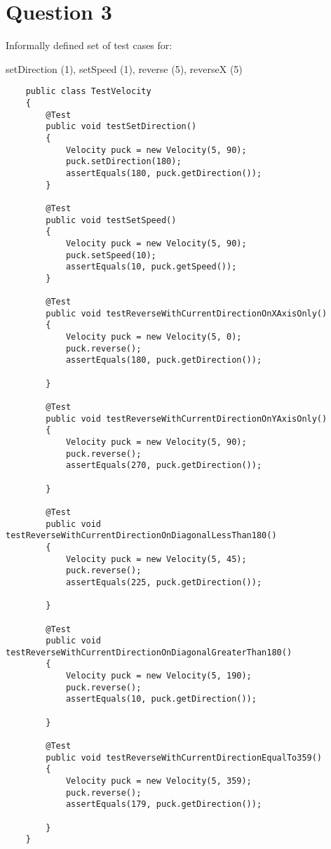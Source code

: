 \documentclass{article}
\begin{document}
\section*{Question 3}

Informally defined set of test cases for:

setDirection (1), setSpeed (1), reverse (5), reverseX (5)

\begin{lstlisting}
    public class TestVelocity
    {
        @Test
        public void testSetDirection()
        {
            Velocity puck = new Velocity(5, 90);
            puck.setDirection(180);
            assertEquals(180, puck.getDirection());
        }

        @Test
        public void testSetSpeed()
        {
            Velocity puck = new Velocity(5, 90);
            puck.setSpeed(10);
            assertEquals(10, puck.getSpeed());
        }

        @Test
        public void testReverseWithCurrentDirectionOnXAxisOnly()
        {
            Velocity puck = new Velocity(5, 0);
            puck.reverse();
            assertEquals(180, puck.getDirection());
            
        }

        @Test
        public void testReverseWithCurrentDirectionOnYAxisOnly()
        {
            Velocity puck = new Velocity(5, 90);
            puck.reverse();
            assertEquals(270, puck.getDirection());
            
        }

        @Test
        public void testReverseWithCurrentDirectionOnDiagonalLessThan180()
        {
            Velocity puck = new Velocity(5, 45);
            puck.reverse();
            assertEquals(225, puck.getDirection());
            
        }

        @Test
        public void testReverseWithCurrentDirectionOnDiagonalGreaterThan180()
        {
            Velocity puck = new Velocity(5, 190);
            puck.reverse();
            assertEquals(10, puck.getDirection());
            
        }

        @Test
        public void testReverseWithCurrentDirectionEqualTo359()
        {
            Velocity puck = new Velocity(5, 359);
            puck.reverse();
            assertEquals(179, puck.getDirection());
            
        }
    }
\end{lstlisting}
\end{document}
